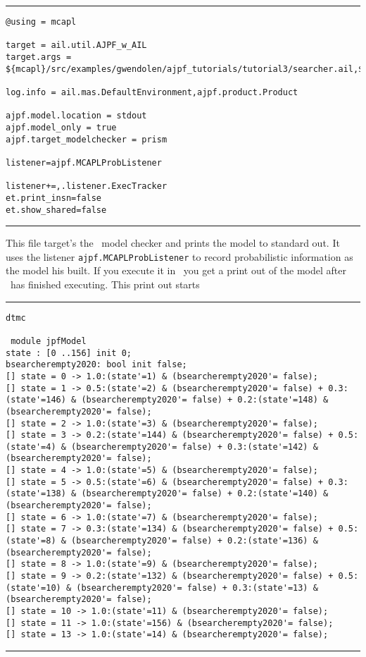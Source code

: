\documentclass[a4]{article}
\begin{document}
\noindent\rule{\textwidth}{1pt}
\begin{small}
\begin{verbatim}
@using = mcapl

target = ail.util.AJPF_w_AIL
target.args = ${mcapl}/src/examples/gwendolen/ajpf_tutorials/tutorial3/searcher.ail,${mcapl}/src/examples/gwendolen/ajpf_tutorials/tutorial3/searcher.psl,1

log.info = ail.mas.DefaultEnvironment,ajpf.product.Product

ajpf.model.location = stdout
ajpf.model_only = true
ajpf.target_modelchecker = prism

listener=ajpf.MCAPLProbListener

listener+=,.listener.ExecTracker
et.print_insn=false
et.show_shared=false
\end{verbatim}
\end{small}
\noindent\rule{\textwidth}{1pt}

This file target's the \prism\ model checker and prints the model to standard out.  It uses the listener \texttt{ajpf.MCAPLProbListener} to record probabilistic information as the model his built.  If you execute it in \ajpf\ you get a print out of the model after \ajpf\  has finished executing.  This print out starts

\noindent\rule{\textwidth}{1pt}
\begin{small}
\begin{verbatim}
dtmc

 module jpfModel
state : [0 ..156] init 0;
bsearcherempty2020: bool init false;
[] state = 0 -> 1.0:(state'=1) & (bsearcherempty2020'= false);
[] state = 1 -> 0.5:(state'=2) & (bsearcherempty2020'= false) + 0.3:(state'=146) & (bsearcherempty2020'= false) + 0.2:(state'=148) & (bsearcherempty2020'= false);
[] state = 2 -> 1.0:(state'=3) & (bsearcherempty2020'= false);
[] state = 3 -> 0.2:(state'=144) & (bsearcherempty2020'= false) + 0.5:(state'=4) & (bsearcherempty2020'= false) + 0.3:(state'=142) & (bsearcherempty2020'= false);
[] state = 4 -> 1.0:(state'=5) & (bsearcherempty2020'= false);
[] state = 5 -> 0.5:(state'=6) & (bsearcherempty2020'= false) + 0.3:(state'=138) & (bsearcherempty2020'= false) + 0.2:(state'=140) & (bsearcherempty2020'= false);
[] state = 6 -> 1.0:(state'=7) & (bsearcherempty2020'= false);
[] state = 7 -> 0.3:(state'=134) & (bsearcherempty2020'= false) + 0.5:(state'=8) & (bsearcherempty2020'= false) + 0.2:(state'=136) & (bsearcherempty2020'= false);
[] state = 8 -> 1.0:(state'=9) & (bsearcherempty2020'= false);
[] state = 9 -> 0.2:(state'=132) & (bsearcherempty2020'= false) + 0.5:(state'=10) & (bsearcherempty2020'= false) + 0.3:(state'=13) & (bsearcherempty2020'= false);
[] state = 10 -> 1.0:(state'=11) & (bsearcherempty2020'= false);
[] state = 11 -> 1.0:(state'=156) & (bsearcherempty2020'= false);
[] state = 13 -> 1.0:(state'=14) & (bsearcherempty2020'= false);
\end{verbatim}
\end{small}
\noindent\rule{\textwidth}{1pt}
\end{document}

